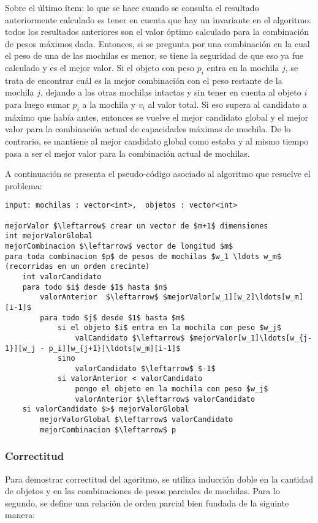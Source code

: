 Sobre el último ítem: lo que se hace cuando se consulta el resultado anteriormente calculado es tener en cuenta que hay un invariante en el algoritmo: todos los resultados anteriores son el valor óptimo calculado para la combinación de pesos máximos dada. Entonces, si se pregunta por una combinación en la cual el peso de una de las mochilas es menor, se tiene la seguridad de que eso ya fue calculado y es el mejor valor. Si el objeto con peso $p_i$ entra en la mochila $j$, se trata de encontrar cuál es la mejor combinación con el peso restante de la mochila $j$, dejando a las otras mochilas intactas y sin tener en cuenta al objeto $i$ para luego sumar $p_i$ a la mochila y $v_i$ al valor total. Si eso supera al candidato a máximo que había antes, entonces se vuelve el mejor candidato global y el mejor valor para la combinación actual de capacidades máximas de mochila. De lo contrario, se mantiene al mejor candidato global como estaba y al mismo tiempo pasa a ser el mejor valor para la combinación actual de mochilas.

A continuación se presenta el pseudo-código asociado al algoritmo que resuelve el problema:

\lstset{basicstyle=\large}
\begin{lstlisting}
input: mochilas : vector<int>,  objetos : vector<int>

mejorValor $\leftarrow$ crear un vector de $m+1$ dimensiones
int mejorValorGlobal
mejorCombinacion $\leftarrow$ vector de longitud $m$
para toda combinacion $p$ de pesos de mochilas $w_1 \ldots w_m$ (recorridas en un orden crecinte)
	int valorCandidato
	para todo $i$ desde $1$ hasta $n$
		valorAnterior  $\leftarrow$ $mejorValor[w_1][w_2]\ldots[w_m][i-1]$
		para todo $j$ desde $1$ hasta $m$
			si el objeto $i$ entra en la mochila con peso $w_j$
				valCandidato $\leftarrow$ $mejorValor[w_1]\ldots[w_{j-1}][w_j - p_i][w_{j+1}]\ldots[w_m][i-1]$
			sino
				valorCandidato $\leftarrow$ $-1$
			si valorAnterior < valorCandidato
				pongo el objeto en la mochila con peso $w_j$
				valorAnterior $\leftarrow$ valorCandidato
	si valorCandidato $>$ mejorValorGlobal
		mejorValorGlobal $\leftarrow$ valorCandidato
		mejorCombinacion $\leftarrow$ p

\end{lstlisting}

\subsubsection{Correctitud}

Para demostrar correctitud del agoritmo, se utiliza inducción doble en la cantidad de objetos y en las combinaciones de pesos parciales de mochilas. Para lo segundo, se define una relación de orden parcial bien fundada de la siguinte manera:

